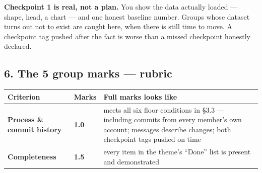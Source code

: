 \documentclass[11pt]{article}
\begin{document}
\textbf{Checkpoint 1 is real, not a plan.} You show the data actually loaded --- shape,
head, a chart --- and one honest baseline number. Groups whose dataset turns out not
to exist are caught here, when there is still time to move. A checkpoint tag
pushed after the fact is worse than a missed checkpoint honestly declared.



\hypertarget{the-5-group-marks-rubric}{%
\subsection{6. The 5 group marks --- rubric}\label{the-5-group-marks-rubric}}

{\footnotesize
\begin{longtable}[]{@{}lll@{}}
\toprule
\begin{minipage}[b]{0.30\columnwidth}\raggedright
Criterion\strut
\end{minipage} & \begin{minipage}[b]{0.30\columnwidth}\raggedright
Marks\strut
\end{minipage} & \begin{minipage}[b]{0.30\columnwidth}\raggedright
Full marks looks like\strut
\end{minipage}\tabularnewline
\midrule
\endhead
\begin{minipage}[t]{0.30\columnwidth}\raggedright
\textbf{Process \& commit history}\strut
\end{minipage} & \begin{minipage}[t]{0.30\columnwidth}\raggedright
\textbf{1.0}\strut
\end{minipage} & \begin{minipage}[t]{0.30\columnwidth}\raggedright
meets all six floor conditions in §3.3 --- including commits from every member's own account; messages describe changes; both checkpoint tags pushed on time\strut
\end{minipage}\tabularnewline
\begin{minipage}[t]{0.30\columnwidth}\raggedright
\textbf{Completeness}\strut
\end{minipage} & \begin{minipage}[t]{0.30\columnwidth}\raggedright
\textbf{1.5}\strut
\end{minipage} & \begin{minipage}[t]{0.30\columnwidth}\raggedright
every item in the theme's ``Done'' list is present and demonstrated\strut
\end{minipage}\tabularnewline

\end{longtable}}
\end{document}
